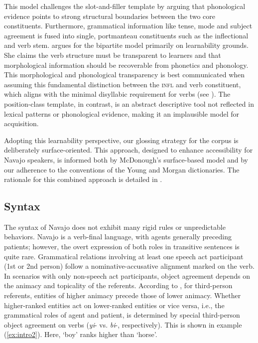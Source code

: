 This model challenges the slot-and-filler template by arguing that phonological evidence points to strong structural boundaries between the two core constituents. Furthermore, grammatical information like tense, mode and subject agreement is fused into single, portmanteau constituents such as the inflectional and verb stem. \citet{McDonough:1995hp} argues for the bipartite model primarily on learnability grounds. She claims the verb structure must be transparent to learners and that morphological information should be recoverable from phonetics and phonology. This morphological and phonological transparency is best communicated when assuming this fundamental distinction between the \textsc{infl} and verb constituent, which aligns with the minimal disyllabic requirement for verbs (see \cite{Speas:1984mo}). The position-class template, in contrast, is an abstract descriptive tool not reflected in lexical patterns or phonological evidence, making it an implausible model for acquisition.

Adopting this learnability perspective, our glossing strategy for the corpus is deliberately surface-oriented. This approach, designed to enhance accessibility for Navajo speakers, is informed both by McDonough's surface-based model and by our adherence to the conventions of the Young and Morgan dictionaries. The rationale for this combined approach is detailed in .

\subsection{Syntax}

The syntax of Navajo does not exhibit many rigid rules or unpredictable behaviors. Navajo is a verb-final language, with agents generally preceding patients; however, the overt expression of both roles in transitive sentences is quite rare. Grammatical relations involving at least one speech act participant (1st or 2nd person) follow a nominative-accusative alignment marked on the verb. In scenarios with only non-speech act participants, object agreement depends on the animacy and topicality of the referents. According to \citet{Willie:2000up}, for third-person referents, entities of higher animacy precede those of lower animacy. Whether higher-ranked entities act on lower-ranked entities or vice versa, i.e., the grammatical roles of agent and patient, is determined by special third-person object agreement on verbs (\textit{yi}- vs. \textit{bi}-, respectively). This is shown in example (\ref{ex:intro2}). Here, `boy' ranks higher than `horse'.

